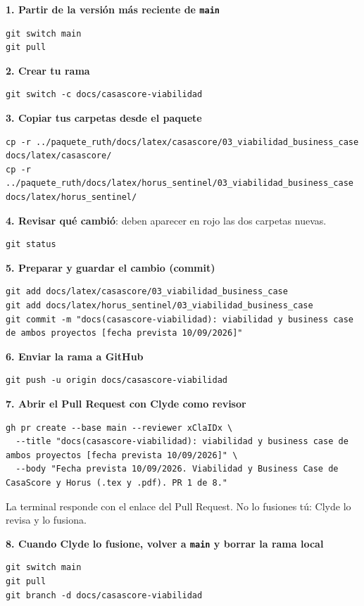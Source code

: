 \documentclass[11pt,a4paper]{article}
\begin{document}
\vspace{0.1cm}
\noindent\textbf{1. Partir de la versión más reciente de \texttt{main}}
\begin{lstlisting}
git switch main
git pull
\end{lstlisting}

\noindent\textbf{2. Crear tu rama}
\begin{lstlisting}
git switch -c docs/casascore-viabilidad
\end{lstlisting}

\noindent\textbf{3. Copiar tus carpetas desde el paquete}
\begin{lstlisting}
cp -r ../paquete_ruth/docs/latex/casascore/03_viabilidad_business_case docs/latex/casascore/
cp -r ../paquete_ruth/docs/latex/horus_sentinel/03_viabilidad_business_case docs/latex/horus_sentinel/
\end{lstlisting}

\noindent\textbf{4. Revisar qué cambió}: deben aparecer en rojo las dos carpetas nuevas.
\begin{lstlisting}
git status
\end{lstlisting}

\noindent\textbf{5. Preparar y guardar el cambio (commit)}
\begin{lstlisting}
git add docs/latex/casascore/03_viabilidad_business_case
git add docs/latex/horus_sentinel/03_viabilidad_business_case
git commit -m "docs(casascore-viabilidad): viabilidad y business case de ambos proyectos [fecha prevista 10/09/2026]"
\end{lstlisting}

\noindent\textbf{6. Enviar la rama a GitHub}
\begin{lstlisting}
git push -u origin docs/casascore-viabilidad
\end{lstlisting}

\noindent\textbf{7. Abrir el Pull Request con Clyde como revisor}
\begin{lstlisting}
gh pr create --base main --reviewer xClaIDx \
  --title "docs(casascore-viabilidad): viabilidad y business case de ambos proyectos [fecha prevista 10/09/2026]" \
  --body "Fecha prevista 10/09/2026. Viabilidad y Business Case de CasaScore y Horus (.tex y .pdf). PR 1 de 8."
\end{lstlisting}

\noindent La terminal responde con el enlace del Pull Request. No lo fusiones tú: Clyde lo revisa y lo fusiona.

\vspace{0.1cm}
\noindent\textbf{8. Cuando Clyde lo fusione, volver a \texttt{main} y borrar la rama local}
\begin{lstlisting}
git switch main
git pull
git branch -d docs/casascore-viabilidad
\end{lstlisting}
\end{document}
